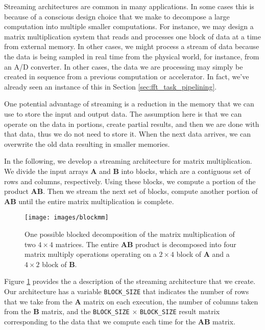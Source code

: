 Streaming architectures are common in many applications.  In some cases this is because of a conscious design choice that we make to decompose a large computation into multiple smaller computations.  For instance, we may design a matrix multiplication system that reads and processes one block of data at a time from external memory.  In other cases, we might process a stream of data because the data is being sampled in real time from the physical world, for instance, from an A/D converter.  In other cases, the data we are processing may simply be created in sequence from a previous computation or accelerator.  In fact, we've already seen an instance of this in Section \ref{sec:fft_task_pipelining}.

One potential advantage of streaming is a reduction in the memory that we can use to store the input and output data. The assumption here is that we can operate on the data in portions, create partial results, and then we are done with that data, thus we do not need to store it. When the next data arrives, we can overwrite the old data resulting in smaller memories.

In the following, we develop a streaming architecture for matrix multiplication. We divide the input arrays $\mathbf{A}$ and $\mathbf{B}$ into blocks, which are a contiguous set of rows and columns, respectively. Using these blocks, we compute a portion of the product $\mathbf{AB}$. Then we stream the next set of blocks, compute another portion of $\mathbf{AB}$ until the entire matrix multiplication is complete.

\begin{figure}
\centering
\texttt{[image: images/blockmm]}
\caption{ One possible blocked decomposition of the matrix multiplication of two $4 \times 4$ matrices. The entire $\mathbf{AB}$ product is decomposed into four matrix multiply operations operating on a $2 \times 4$ block of $\mathbf{A}$ and a $4 \times 2$ block of $\mathbf{B}$.}
\label{fig:blockmm}
\end{figure}

Figure \ref{fig:blockmm} provides the a description of the streaming architecture that we create. Our architecture has a variable \lstinline{BLOCK_SIZE} that indicates the number of rows that we take from the $\mathbf{A}$ matrix on each execution, the number of columns taken from the $\mathbf{B}$ matrix, and the \lstinline{BLOCK_SIZE} $\times$ \lstinline{BLOCK_SIZE} result matrix corresponding to the data that we compute each time for the $\mathbf{AB}$ matrix. 

